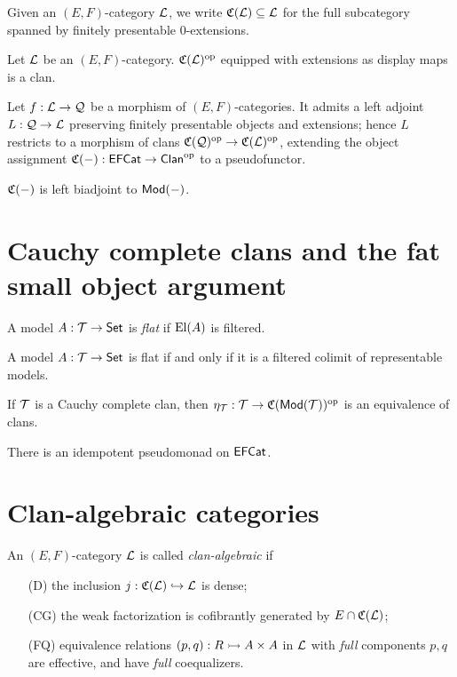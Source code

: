 \documentclass[a4paper]{article}
\begin{document}
\begin{definition}
  Given an $(E,F)$-category $\mathcal{L}$, we write $\mathfrak{C}(\mathcal{L}) \subseteq \mathcal{L}$ for the full subcategory spanned by finitely presentable $0$-extensions.
\end{definition}

\begin{lemma}
  Let $\mathcal{L}$ be an $(E,F)$-category.
  $\mathfrak{C}(\mathcal{L})^{\mathrm{op}}$ equipped with extensions as display maps is a clan.
\end{lemma}

\begin{construction}
  Let $f : \mathcal{L} \to \mathcal{Q}$ be a morphism of $(E,F)$-categories.
  It admits a left adjoint $L : \mathcal{Q} \to \mathcal{L}$ preserving finitely presentable objects and extensions; hence $L$ restricts to a morphism of clans $\mathfrak{C}(\mathcal{Q})^{\mathrm{op}} \to \mathfrak{C}(\mathcal{L})^{\mathrm{op}}$, extending the object assignment $\mathfrak{C}(-) : \mathsf{EFCat} \to \mathsf{Clan}^{\mathrm{op}}$ to a pseudofunctor.
\end{construction}

\begin{theorem}
  $\mathfrak{C}(-)$ is left biadjoint to $\mathsf{Mod}(-)$.
\end{theorem}

\section{Cauchy complete clans and the fat small object argument}

\begin{definition}
  A model $A : \mathcal{T} \to \mathsf{Set}$ is \emph{flat} if $\operatorname{El}(A)$ is filtered.
\end{definition}

\begin{lemma}
  A model $A : \mathcal{T} \to \mathsf{Set}$ is flat if and only if it is a filtered colimit of representable models.
\end{lemma}

\begin{theorem}
  If $\mathcal{T}$ is a Cauchy complete clan, then $\eta_{\mathcal{T}} : \mathcal{T} \to \mathfrak{C}(\mathsf{Mod}(\mathcal{T}))^{\mathrm{op}}$ is an equivalence of clans.
\end{theorem}

There is an idempotent pseudomonad on $\mathsf{EFCat}$.

\section{Clan-algebraic categories}

\begin{definition}
  An $(E,F)$-category $\mathcal{L}$ is called \emph{clan-algebraic} if
  \begin{enumerate}
  \item[(D)] the inclusion $j : \mathfrak{C}(\mathcal{L}) \hookrightarrow \mathcal{L}$ is dense;
  \item[(CG)] the weak factorization is cofibrantly generated by $E \cap \mathfrak{C}(\mathcal{L})$;
  \item[(FQ)] equivalence relations $(p,q) : R \rightarrowtail A \times A$ in $\mathcal{L}$ with \emph{full} components $p, q$ are effective, and have \emph{full} coequalizers.
  \end{enumerate}
\end{definition}
\end{document}
